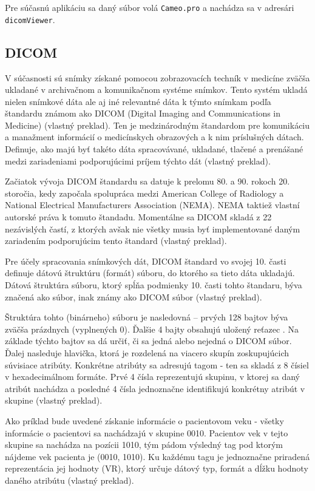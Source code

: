 Pre súčasnú aplikáciu sa daný súbor volá \texttt{Cameo.pro} a nachádza sa v adresári \texttt{dicomViewer}.

\subsection {DICOM}\label{dicom}

V súčasnosti sú snímky získané pomocou zobrazovacích techník v medicíne zväčša ukladané v archivačnom a komunikačnom systéme snímkov. Tento systém ukladá nielen snímkové dáta ale aj iné relevantné dáta k týmto snímkam podľa štandardu známom ako DICOM (Digital Imaging and Communications in Medicine) \cite{Varma_2012} (vlastný preklad). Ten je medzinárodným štandardom pre komunikáciu a manažment informácií o medicínskych obrazových a k nim príslušných dátach. Definuje, ako majú byť takéto dáta spracovávané, ukladané, tlačené a prenášané medzi zariadeniami podporujúcimi príjem týchto dát \cite{about_dicomlibrary} (vlastný preklad).

Začiatok vývoja DICOM štandardu sa datuje k prelomu 80. a 90. rokoch 20. storočia, kedy započala spolupráca medzi American College of Radiology a National Electrical Manufacturers Association (NEMA). NEMA taktiež vlastní autorské práva k tomuto štandadu. Momentálne sa DICOM skladá z 22 nezávislých častí, z ktorých avšak nie všetky musia byť implementované daným zariadením podporujúcim tento štandard \cite{dicom_history} (vlastný preklad).

Pre účely spracovania snímkových dát, DICOM štandard vo svojej 10. časti definuje dátovú štruktúru (formát) súboru, do ktorého sa tieto dáta ukladajú. Dátová štruktúra súboru, ktorý spĺňa podmienky 10. časti tohto štandaru, býva značená ako  súbor, inak známy ako DICOM súbor \cite{Varma_2012} (vlastný preklad).

Štruktúra tohto (binárneho) súboru je nasledovná -- prvých 128 bajtov býva zväčša prázdnych (vyplnených 0). Ďalšie 4 bajty obsahujú uložený reťazec .  Na základe týchto bajtov sa dá určiť, či sa jedná alebo nejedná o DICOM súbor.
Ďalej nasleduje hlavička, ktorá je rozdelená na viacero skupín zoskupujúcich súvisiace atribúty. Konkrétne atribúty sa adresujú tagom - ten sa skladá z 8 čísiel v hexadecimálnom formáte. Prvé 4 čísla reprezentujú skupinu, v ktorej sa daný atribút nachádza a posledné 4 čísla jednoznačne identifikujú konkrétny atribút v skupine \cite{Varma_2012} (vlastný preklad).

Ako príklad bude uvedené získanie informácie o pacientovom veku - všetky informácie o pacientovi sa nachádzajú v skupine 0010. Pacientov vek v tejto skupine sa nachádza na pozícii 1010, tým pádom výsledný tag pod ktorým nájdeme vek pacienta je (0010, 1010). Ku každému tagu je jednoznačne priradená reprezentácia jej hodnoty (VR), ktorý určuje dátový typ, formát a dĺžku hodnoty daného atribútu  \cite{Varma_2012} (vlastný preklad).

